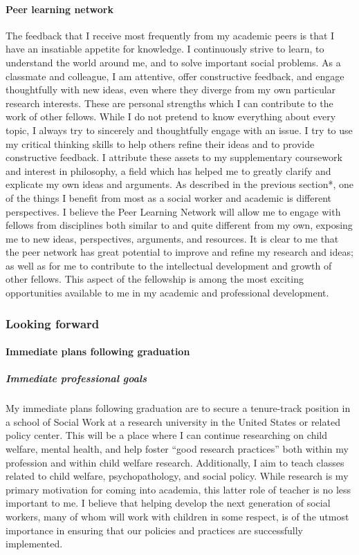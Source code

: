\documentclass[twocolumn, issue, rga, authordate]{jote-new-article}
\begin{document}
\paragraph{Peer learning network}


The feedback that I receive most frequently from my academic peers is
that I have an insatiable appetite for knowledge. I continuously strive
to learn, to understand the world around me, and to solve important
social problems. As a classmate and colleague, I am attentive, offer
constructive feedback, and engage thoughtfully with new ideas, even
where they diverge from my own particular research interests. These are
personal strengths which I can contribute to the work of other fellows.
While I do not pretend to know everything about every topic, I always
try to sincerely and thoughtfully engage with an issue. I try to use my
critical thinking skills to help others refine their ideas and to
provide constructive feedback. I attribute these assets to my
supplementary coursework and interest in philosophy, a field which has
helped me to greatly clarify and explicate my own ideas and arguments.
\balance
As described in the previous section*, one of the things I benefit from
most as a social worker and academic is different perspectives. I
believe the Peer Learning Network will allow me to engage with fellows
from disciplines both similar to and quite different from my own,
exposing me to new ideas, perspectives, arguments, and resources. It is
clear to me that the peer network has great potential to improve and
refine my research and ideas; as well as for me to contribute to the
intellectual development and growth of other fellows. This aspect of the
fellowship is among the most exciting opportunities available to me in
my academic and professional development.





\subsubsection{Looking forward}



\paragraph{Immediate plans following graduation}


\subparagraph{Immediate professional goals} My immediate plans following
graduation are to secure a tenure-track position in a school of Social
Work at a research university in the United States or related policy
center. This will be a place where I can continue researching on child
welfare, mental health, and help foster ``good research practices'' both
within my profession and within child welfare research. Additionally, I
aim to teach classes related to child welfare, psychopathology, and
social policy. While research is my primary motivation for coming into
academia, this latter role of teacher is no less important to me. I
believe that helping develop the next generation of social workers, many
of whom will work with children in some respect, is of the utmost
importance in ensuring that our policies and practices are successfully
implemented.
\end{document}
